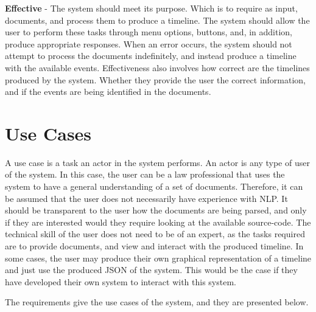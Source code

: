 \par \textbf{Effective} - The system should meet its purpose. Which is to require as input, documents, and process them to produce a timeline. The system should allow the user to perform these tasks through menu options, buttons, and, in addition, produce appropriate responses. When an error occurs, the system should not attempt to process the documents indefinitely, and instead produce a timeline with the available events. Effectiveness also involves how correct are the timelines produced by the system. Whether they provide the user the correct information, and if the events are being identified in the documents. 

\section{Use Cases}
\par A use case is a task an actor in the system performs. An actor is any type of user of the system. In this case, the user can be a law professional that uses the system to have a general understanding of a set of documents. Therefore, it can be assumed that the user does not necessarily have experience with NLP. It should be transparent to the user how the documents are being parsed, and only if they are interested would they require looking at the available source-code. The technical skill of the user does not need to be of an expert, as the tasks required are to provide documents, and view and interact with the produced timeline. In some cases, the user may produce their own graphical representation of a timeline and just use the produced JSON of the system. This would be the case if they have developed their own system to interact with this system.
\par The requirements give the use cases of the system, and they are presented below. 

